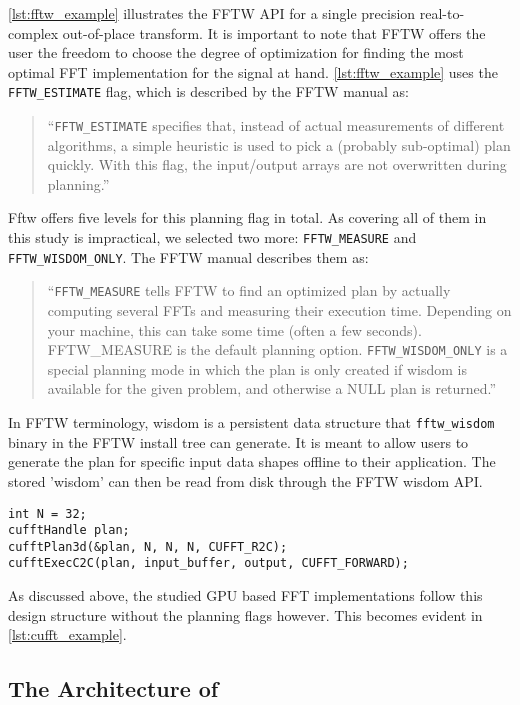 \cref{lst:fftw_example} illustrates the FFTW API for a single precision real-to-complex out-of-place transform. It is important to note that FFTW offers the user the freedom to choose the degree of optimization for finding the most optimal FFT implementation for the signal at hand. \cref{lst:fftw_example} uses the \texttt{FFTW\_ESTIMATE} flag, which is described by the FFTW manual \cite{fftw_manual} as:
%
\begin{quote}
  ``\texttt{FFTW\_ESTIMATE} specifies that, instead of actual measurements of different algorithms, a simple heuristic is used to pick a (probably sub-optimal) plan quickly. With this flag, the input/output arrays are not overwritten during planning.''
\end{quote}
%
Fftw offers five levels for this planning flag in total. As covering all of them in this study is impractical, we selected two more: \texttt{FFTW\_MEASURE} and \texttt{FFTW\_WISDOM\_ONLY}. The FFTW manual describes them as:
%
\begin{quote}
  ``\texttt{FFTW\_MEASURE} tells FFTW to find an optimized plan by actually computing several FFTs and measuring their execution time. Depending on your machine, this can take some time (often a few seconds). FFTW\_MEASURE is the default planning option.\newline
  \texttt{FFTW\_WISDOM\_ONLY} is a special planning mode in which the plan is only created if wisdom is available for the given problem, and otherwise a NULL plan is returned.''
\end{quote}
%
In FFTW terminology, wisdom is a persistent data structure that \texttt{fftw\_wisdom} binary in the FFTW install tree can generate. It is meant to allow users to generate the plan for specific input data shapes offline to their application. The stored 'wisdom' can then be read from disk through the FFTW wisdom API. 
%
\begin{lstlisting}[caption={Minimal usage example of the cuFFT single precision real-to-complex planner API. Memory management is omitted.},label={lst:cufft_example}]
int N = 32;
cufftHandle plan;
cufftPlan3d(&plan, N, N, N, CUFFT_R2C);
cufftExecC2C(plan, input_buffer, output, CUFFT_FORWARD);
\end{lstlisting}
%
As discussed above, the studied GPU based FFT implementations follow this design structure without the planning flags however. This becomes evident in \cref{lst:cufft_example}. 
 

\subsection{The Architecture of \gearshifft{}}
\label{ssec:modern_ffts}


